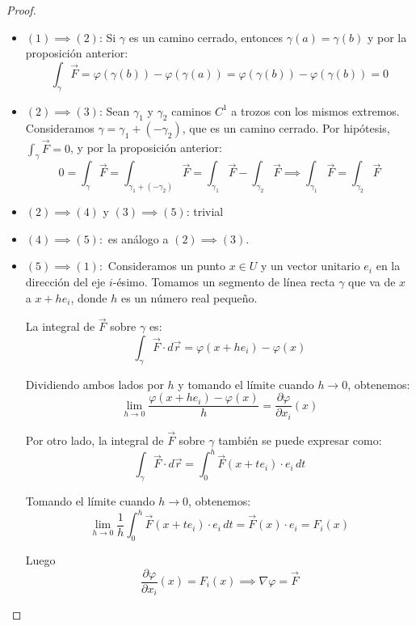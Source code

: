 \begin{proof}
    \leavevmode
    \begin{itemize}
        \item $(1) \implies (2)$: Si $\gamma$ es un camino cerrado, entonces $\gamma(a) = \gamma(b)$ y por la proposición anterior:
              \[
                  \int_{\gamma} \vec{F} = \varphi(\gamma(b)) - \varphi(\gamma(a)) = \varphi(\gamma(b)) - \varphi(\gamma(b)) = 0
              \]
        \item $(2) \implies (3)$: Sean $\gamma_1$ y $\gamma_2$ caminos $C^1$ a trozos con los mismos extremos. Consideramos $\gamma = \gamma_1 + (-\gamma_2)$, que es un camino cerrado. Por hipótesis, $\int_{\gamma} \vec{F} = 0$, y por la proposición anterior:
              \[
                  0 = \int_{\gamma} \vec{F} = \int_{\gamma_1 + (-\gamma_2)} \vec{F} = \int_{\gamma_1} \vec{F} - \int_{\gamma_2} \vec{F} \implies \int_{\gamma_1} \vec{F} = \int_{\gamma_2} \vec{F}
              \]
        \item $(2) \implies (4)$ y $(3) \implies (5)$: trivial
        \item $(4) \implies (5):$ es análogo a $(2) \implies (3)$.
        \item $(5) \implies (1):$ Consideramos un punto \(x \in U\) y un vector unitario \(e_i\) en la dirección del eje \(i\)-ésimo. Tomamos un segmento de línea recta \(\gamma\) que va de \(x\) a \(x + h e_i\), donde \(h\) es un número real pequeño.

              La integral de \(\vec{F}\) sobre \(\gamma\) es:
              \[
                  \int_{\gamma} \vec{F} \cdot d\vec{r} = \varphi(x + h e_i) - \varphi(x)
              \]

              Dividiendo ambos lados por \(h\) y tomando el límite cuando \(h \to 0\),
              obtenemos:
              \[
                  \lim_{h \to 0} \frac{\varphi(x + h e_i) - \varphi(x)}{h} = \frac{\partial \varphi}{\partial x_i}(x)
              \]

              Por otro lado, la integral de \(\vec{F}\) sobre \(\gamma\) también se puede
              expresar como:
              \[
                  \int_{\gamma} \vec{F} \cdot d\vec{r} = \int_{0}^{h} \vec{F}(x + t e_i) \cdot e_i \, dt
              \]

              Tomando el límite cuando \(h \to 0\), obtenemos:
              \[
                  \lim_{h \to 0} \frac{1}{h} \int_{0}^{h} \vec{F}(x + t e_i) \cdot e_i \, dt = \vec{F}(x) \cdot e_i = F_i(x)
              \]

              Luego
              \[
                  \frac{\partial \varphi}{\partial x_i}(x) = F_i(x) \implies \nabla \varphi = \vec{F}
              \]
    \end{itemize}
\end{proof}

